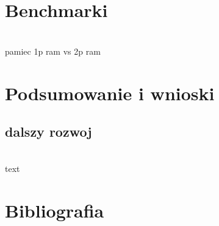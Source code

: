 \documentclass[11pt,a4paper]{article}
\begin{document}
\newpage
\section{Benchmarki}
\hspace{5mm}
	\\ pamiec 1p ram vs 2p ram

\newpage
\section{Podsumowanie i wnioski}
	\subsection{dalszy rozwoj}
	\hspace{5mm}
		\\text

\newpage

\section{Bibliografia}
\end{document}
